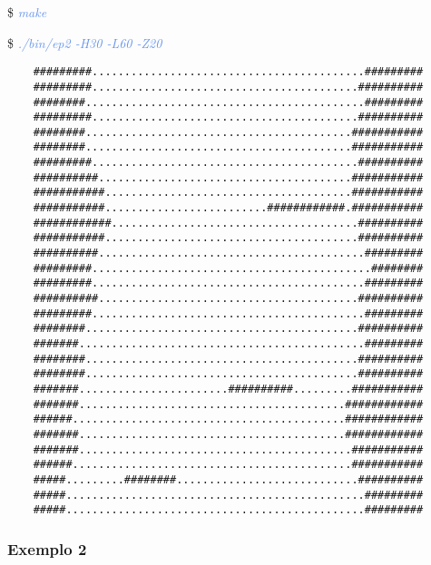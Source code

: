 \documentclass[a4paper,12pt]{article}
\begin{document}
    \$ \textcolor{CornflowerBlue}{\textit{make}}
    
    \$ \textcolor{CornflowerBlue}{\textit{./bin/ep2 -H30 -L60 -Z20}}
  
    \bigskip
    \begin{verbatim}
    #########..........................................#########
    #########.........................................##########
    ########...........................................#########
    #########.........................................##########
    ########.........................................###########
    ########.........................................###########
    #########.........................................##########
    ##########.......................................###########
    ###########......................................###########
    ###########.........................############.###########
    ############......................................##########
    ###########.......................................##########
    ##########.........................................#########
    #########...........................................########
    #########..........................................#########
    ##########........................................##########
    #########..........................................#########
    ########..........................................##########
    #######............................................#########
    ########..........................................##########
    ########..........................................##########
    #######.......................##########.........###########
    #######.........................................############
    ######..........................................############
    #######.........................................############
    #######..........................................###########
    ######...........................................###########
    #####.........########............................##########
    #####..............................................#########
    #####..............................................#########
    \end{verbatim}
  
  \newpage %
    \subsubsection{\textcolor{NavyBlue}{Exemplo 2}}
    
\end{document}
